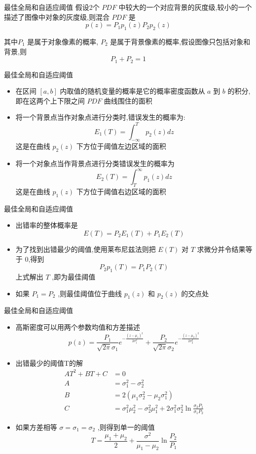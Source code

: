 \documentclass[presentation]{beamer}
\begin{document}
\begin{frame}[label={sec:orga631ff3}]{最佳全局和自适应阈值}
假设2个 \(PDF\) 中较大的一个对应背景的灰度级,较小的一个描述了图像中对象的灰度级,则混合 \(PDF\) 是
 \[ p(z) =P_1 p_1(z)P_2 p_2(z) \]

其中\(P_1\) 是属于对象像素的概率, \(P_2\) 是属于背景像素的概率,假设图像只包括对象和背景,则
 \[ P_1+P_2=1 \]
\end{frame}

\begin{frame}[label={sec:orgcd9bc24}]{最佳全局和自适应阈值}
\begin{itemize}
\item 在区间 \([a,b]\) 内取值的随机变量的概率是它的概率密度函数从 \(a\) 到 \(b\) 的积分,即在这两个上下限之间 \(PDF\) 曲线围住的面积
\item 将一个背景点当作对象点进行分类时,错误发生的概率为:
 \[ E_1(T) = \int_{-\infty}^{T}p_2(z) dz \]
这是在曲线 \(p_2(z)\) 下方位于阈值左边区域的面积
\item 将一个对象点当作背景点进行分类错误发生的概率为
 \[ E_2(T) = \int_{T}^{\infty}p_1(z) dz \]
这是在曲线 \(p_1(z)\) 下方位于阈值右边区域的面积
\end{itemize}
\end{frame}

\begin{frame}[label={sec:org96b0bf8}]{最佳全局和自适应阈值}
\begin{itemize}
\item 出错率的整体概率是
\[ E(T)=P_2E_1(T)+P_1E_2(T) \]
\item 为了找到出错最少的阈值,使用莱布尼兹法则把 \(E(T)\) 对 \(T\) 求微分并令结果等于 0,得到
\[ P_2 p_1(T) =P_1 P_2(T)\]
 上式解出 \(T\) ,即为最佳阈值
\item 如果 \(P_1=P_2\) ,则最佳阈值位于曲线 \(p_1(z)\) 和 \(p_2(z)\) 的交点处
\end{itemize}
\end{frame}

\begin{frame}[label={sec:orgdbf1335}]{最佳全局和自适应阈值}
\begin{itemize}
\item 高斯密度可以用两个参数均值和方差描述
\[ p(z)=\frac{P_1}{\sqrt{2\pi}\sigma_1}e^{-\frac{(z-\mu_1)^2}{2\sigma_1^2}}+\frac{P_2}{\sqrt{2\pi}\sigma_2}e^{-\frac{(z-\mu_2)^2}{2\sigma_2^2}}\]
\item 出错最少的阈值T的解
\begin{align*}
  A T^2+BT+C &=0 \\
   A &= \sigma_1^2-\sigma_2^2 \\
   B &= 2(\mu_1\sigma_2^2-\mu_2\sigma_1^2)\\
   C &= \sigma_1^2\mu_2^2-\sigma_2^2\mu_1^2+2\sigma_1^2\sigma_2^2\ln\frac{\sigma_2P_1}{\sigma_1P_2}
\end{align*}
\item 如果方差相等 \(\sigma=\sigma_1=\sigma_2\) ,则得到单一的阈值
\[ T=\frac{\mu_1+\mu_2}{2}+\frac{\sigma^2}{\mu_1-\mu_2}\ln \frac{P_2}{P_1} \]
\end{itemize}
\end{frame}
\end{document}

